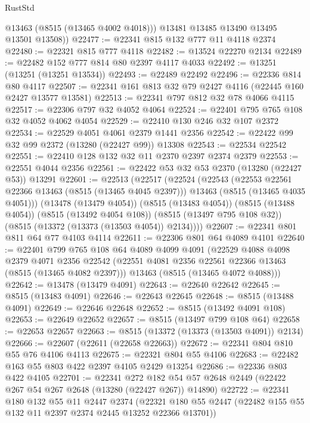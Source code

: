 \begin{lexlean}{RustStd}
\begin{coremodule}
          @13463
          (@8515 (@13465 @4002 @4018)))
        @13481
        @13485
        @13490
        @13495
        @13501
        @13508))
@22477 := @22341 @815 @132 @777 @11 @4118 @2374
@22480 := @22321 @815 @777 @4118
@22482 := @13524 @22270 @2134
@22489 := @22482 @152 @777 @814 @80 @2397 @4117 @4033
@22492 := @13251 (@13251 (@13251 @13534))
@22493 := @22489 @22492
@22496 := @22336 @814 @80 @4117
@22507 := @22341 @161 @813 @32 @79 @2427 @4116 (@22445 @160 @2427 @13577 @13581)
@22513 := @22341 @797 @812 @32 @78 @4066 @4115
@22517 := @22306 @797 @32 @4052 @4064
@22524 := @22401 @795 @765 @108 @32 @4052 @4062 @4054
@22529 := @22410 @130 @246 @32 @107 @2372
@22534 := @22529 @4051 @4061 @2379 @1441 @2356
@22542 := @22422 @99 @32 @99 @2372 (@13280 (@22427 @99)) @13308
@22543 := @22534 @22542
@22551 := @22410 @128 @132 @32 @11 @2370 @2397 @2374 @2379
@22553 := @22551 @4044 @2356
@22561 := @22422 @53 @32 @53 @2370 (@13280 (@22427 @53)) @13291
@22601 := @22513
    (@22517
      (@22524
        (@22543
          (@22553 @22561 @22366 @13463 (@8515 (@13465 @4045 @2397)))
          @13463
          (@8515 (@13465 @4035 @4051)))
        (@13478 (@13479 @4054))
        (@8515 (@13483 @4054))
        (@8515 (@13488 @4054))
        (@8515 (@13492 @4054 @108))
        (@8515 (@13497 @795 @108 @32))
        (@8515 (@13372 (@13373 (@13503 @4054)) @2134))))
@22607 := @22341 @801 @811 @64 @77 @4103 @4114
@22611 := @22306 @801 @64 @4089 @4101
@22640 := @22401
    @799
    @765
    @108
    @64
    @4089
    @4099
    @4091
    (@22529
      @4088
      @4098
      @2379
      @4071
      @2356
      @22542
      (@22551 @4081 @2356 @22561 @22366 @13463 (@8515 (@13465 @4082 @2397)))
      @13463
      (@8515 (@13465 @4072 @4088)))
@22642 := @13478 (@13479 @4091)
@22643 := @22640 @22642
@22645 := @8515 (@13483 @4091)
@22646 := @22643 @22645
@22648 := @8515 (@13488 @4091)
@22649 := @22646 @22648
@22652 := @8515 (@13492 @4091 @108)
@22653 := @22649 @22652
@22657 := @8515 (@13497 @799 @108 @64)
@22658 := @22653 @22657
@22663 := @8515 (@13372 (@13373 (@13503 @4091)) @2134)
@22666 := @22607 (@22611 (@22658 @22663))
@22672 := @22341 @804 @810 @55 @76 @4106 @4113
@22675 := @22321 @804 @55 @4106
@22683 := @22482 @163 @55 @803 @422 @2397 @4105 @2429 @13254
@22686 := @22336 @803 @422 @4105
@22701 := @22341
    @272
    @182
    @54
    @57
    @2648
    @2449
    (@22422 @267 @54 @267 @2648 (@13280 (@22427 @267)) @14890)
@22722 := @22341
    @180
    @132
    @55
    @11
    @2447
    @2374
    (@22321 @180 @55 @2447 (@22482 @155 @55 @132 @11 @2397 @2374 @2445 @13252 @22366 @13701))

\end{coremodule}
\end{lexlean}
